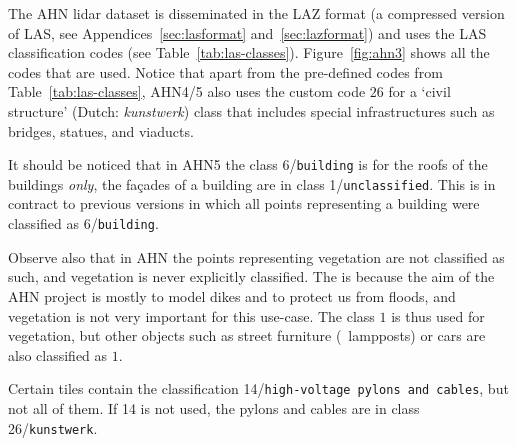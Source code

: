 %

The AHN lidar dataset is disseminated in the LAZ format (a compressed version of LAS, see Appendices~\ref{sec:lasformat} and~\ref{sec:lazformat}) and uses the LAS classification codes (see Table~\ref{tab:las-classes}). 
Figure~\ref{fig:ahn3} shows all the codes that are used. 
Notice that apart from the pre-defined codes from Table~\ref{tab:las-classes}, AHN4/5 also uses the custom code $26$ for a `civil structure' (Dutch: \emph{kunstwerk}) class that includes special infrastructures such as bridges, statues, and viaducts. 

%

It should be noticed that in AHN5 the class 6/\texttt{building} is for the roofs of the buildings \emph{only}, the façades of a building are in class 1/\texttt{unclassified}.
This is in contract to previous versions in which all points representing a building were classified as 6/\texttt{building}.

%

Observe also that in AHN the points representing vegetation are not classified as such, and vegetation is never explicitly classified.
The is because the aim of the AHN project is mostly to model dikes and to protect us from floods, and vegetation is not very important for this use-case.
The class $1$ is thus used for vegetation, but other objects such as street furniture (\eg\ lampposts) or cars are also classified as $1$.

%

Certain tiles contain the classification 14/\texttt{high-voltage pylons and cables}, but not all of them. 
If 14 is not used, the pylons and cables are in class 26/\texttt{kunstwerk}.

%


